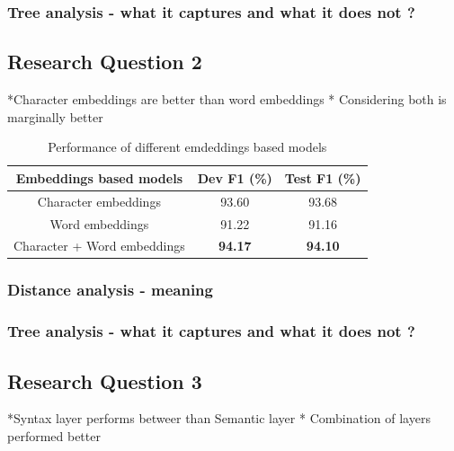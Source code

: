 \documentclass[a4paper, 11pt]{article}
\begin{document}
\subsubsection{Tree analysis - what it captures and what it does not ?}

\pagebreak
\subsection{Research Question 2}

*Character embeddings are better than word embeddings
* Considering both is marginally better

\begin{table}[h!]
  \begin{center}
    \label{tab:table1}
    \def\arraystretch{1.5}%
    \begin{tabular}{c|c|c}
      Embeddings based models & Dev F1 (\%) & Test F1 (\%) \\
      \hline
      Character embeddings & 93.60 & 93.68\\
      Word embeddings  & 91.22 & 91.16\\
      Character + Word embeddings & \textbf{94.17} & \textbf{94.10}\\
    \end{tabular}
    \caption{Performance of different emdeddings based models }
  \end{center}
\end{table}

\subsubsection{Distance analysis - meaning}


\subsubsection{Tree analysis - what it captures and what it does not ?}


\pagebreak
\subsection{Research Question 3}

*Syntax layer performs betweer than Semantic layer
* Combination of layers performed better
\end{document}
